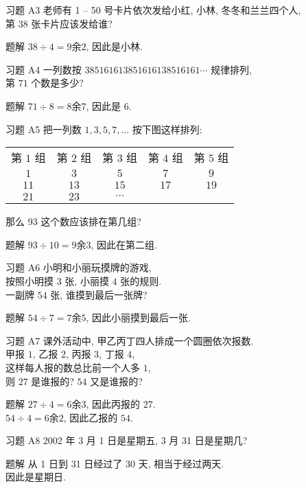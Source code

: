 \documentclass[content.tex]{subfiles}
\begin{document}
\begin{frame}{习题 A3}
老师有 1 -- 50 号卡片依次发给小红, 小林, 冬冬和兰兰四个人, \\
第 $38$ 张卡片应该发给谁?
\begin{exampleblock}{题解}
$38\div 4 = 9\text{余}2$, 因此是小林.
\end{exampleblock}
\end{frame}

\begin{frame}{习题 A4}
一列数按 $385161613851616138516161\cdots$ 规律排列, \\
第 $71$ 个数是多少?
\begin{exampleblock}{题解}
$71\div 8 = 8\text{余}7$, 因此是 $6$.
\end{exampleblock}
\end{frame}

\begin{frame}{习题 A5}
把一列数 $1,3,5,7, \ldots$ 按下图这样排列: \\
\begin{center}
\begin{tabular}{ccccc}
第 $1$ 组 & 第 $2$ 组 & 第 $3$ 组 & 第 $4$ 组 & 第 $5$ 组 \\
$1$ & $3$ & $5$ & $7$ & $9$ \\
$11$ & $13$ & $15$ & $17$ & $19$ \\
$21$ & $23$ & $\cdots$ \\
\end{tabular}
\end{center}
那么 93 这个数应该排在第几组?
\begin{exampleblock}{题解}
$93\div 10 = 9\text{余}3$, 因此在第二组.
\end{exampleblock}
\end{frame}

\begin{frame}{习题 A6}
小明和小丽玩摸牌的游戏, \\
按照小明摸 $3$ 张, 小丽摸 $4$ 张的规则. \\
一副牌 $54$ 张, 谁摸到最后一张牌?
\begin{exampleblock}{题解}
$54\div 7 = 7\text{余}5$, 因此小丽摸到最后一张.
\end{exampleblock}
\end{frame}

\begin{frame}{习题 A7}
课外活动中, 甲乙丙丁四人排成一个圆圈依次报数. \\
甲报 $1$, 乙报 $2$, 丙报 $3$, 丁报 $4$, \\
这样每人报的数总比前一个人多 $1$, \\
则 $27$ 是谁报的? $54$ 又是谁报的?
\begin{exampleblock}{题解}
$27\div 4 = 6\text{余}3$, 因此丙报的 $27$. \\
$54\div 4 = 6\text{余}2$, 因此乙报的 $54$. \\
\end{exampleblock}
\end{frame}

\begin{frame}{习题 A8}
2002 年 3 月 1 日是星期五, 3 月 31 日是星期几?
\begin{exampleblock}{题解}
从 1 日到 31 日经过了 30 天, 相当于经过两天. \\
因此是星期日.
\end{exampleblock}
\end{frame}
\end{document}
